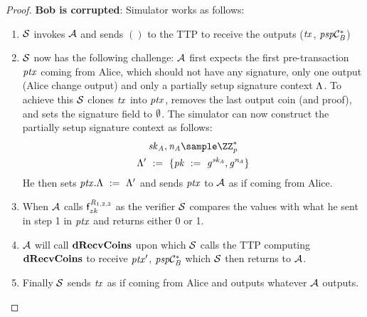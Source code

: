 \begin{proof}
    \textbf{Bob is corrupted}: Simulator works as follows:
    \begin{enumerate}
        \item $\mathcal{S}$ invokes $\mathcal{A}$ and sends $()$ to the TTP to receive the outputs ($\mathit{tx}$, $\mathit{psp}\mathcal{C}_{\mathit{B}}^*$)
        \item $\mathcal{S}$ now has the following challenge: $\mathcal{A}$ first expects the first pre-transaction $\mathit{ptx}$ coming from Alice, which should not have any signature, only one output (Alice change output) and only a partially setup signature context $\Lambda$.
        To achieve this $\mathcal{S}$ clones $\mathit{tx}$ into $\mathit{ptx}$, removes the last output coin (and proof), and sets the signature field to $\emptyset$.
        The simulator can now construct the partially setup signature context as follows:
        \begin{gather*}
            \varSecKeyAlice, \varNonceAlice \sample \cnstIntegersPrimeWithoutZero{\varPrime} \\
            \funStarAlt{\varSigContext} \opAssign \{ \varPubKey \opAssign \funGen{\varSecKeyAlice}, \funGen{\varNonceAlice} \}
        \end{gather*}
        He then sets $\mathit{ptx}.\Lambda ~:=~ {\Lambda}'$ and sends $\mathit{ptx}$ to $\mathcal{A}$ as if coming from Alice.
        \item When $\mathcal{A}$ calls $\mathsf{f}^{\mathit{R}_{1,2,3}}_{zk}$ as the verifier $\mathcal{S}$ compares the values with what he sent in step 1 in $\mathit{ptx}$ and returns either 0 or 1.
        \item $\mathcal{A}$ will call $\mathbf{dRecvCoins}$ upon which $\mathcal{S}$ calls the TTP computing $\mathbf{dRecvCoins}$ to receive ${\mathit{ptx}}'$, $\mathit{psp}\mathcal{C}_{\mathit{B}}^*$ which $\mathcal{S}$ then returns to $\mathcal{A}$.
        \item Finally $\mathcal{S}$ sends $\mathit{tx}$ as if coming from Alice and outputs whatever $\mathcal{A}$ outputs.
    \end{enumerate}


\end{proof}
